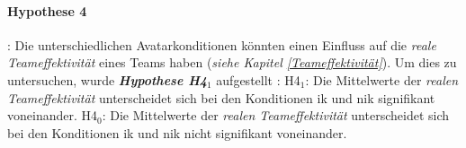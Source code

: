 \documentclass[a4paper,11pt]{article}%
\renewcommand{\\}{\vspace*{0.5\baselineskip} \newline}
\begin{document}
\paragraph{Hypothese 4}:
Die unterschiedlichen Avatarkonditionen könnten einen Einfluss auf die \textit{reale Teameffektivität} eines Teams haben (\textit{siehe Kapitel \ref{Teameffektivität}}). Um dies zu untersuchen, wurde \textbf{\textit{Hypothese H4$_{1}$}} aufgestellt :\\
H4$_{1}$: Die Mittelwerte der \textit{realen Teameffektivität} unterscheidet sich bei den Konditionen \ac{ik} und \ac{nik} signifikant voneinander. \newline
H4$_{0}$: Die Mittelwerte der \textit{realen Teameffektivität} unterscheidet sich bei den Konditionen \ac{ik} und \ac{nik} nicht signifikant voneinander. \\
%	
\end{document}
